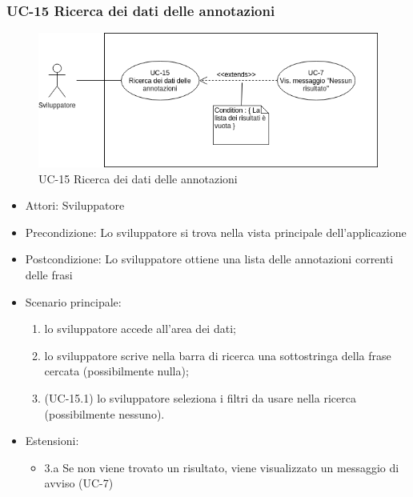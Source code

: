 \subsubsection{UC-15 Ricerca dei dati delle annotazioni}
		\begin{figure}[h]
			\centering
			\includegraphics[scale=0.7]{images/UC-15.png}
			\caption{UC-15 Ricerca dei dati delle annotazioni}
		\end{figure}			
	
		\begin{itemize}
			\item Attori: Sviluppatore
			\item Precondizione: Lo sviluppatore si trova nella vista principale dell'applicazione
			\item Postcondizione: Lo sviluppatore ottiene una lista delle annotazioni correnti delle frasi
			\item Scenario principale:
				\begin{enumerate}
					\item lo sviluppatore accede all'area dei dati;
					\item lo sviluppatore scrive nella barra di ricerca una sottostringa della frase cercata (possibilmente nulla);
					\item (UC-15.1) lo sviluppatore seleziona i filtri da usare nella ricerca (possibilmente nessuno).
				\end{enumerate}
			\item Estensioni:
				\begin{itemize}
					\item 3.a Se non viene trovato un risultato, viene visualizzato un messaggio di avviso (UC-7)
				\end{itemize}
		\end{itemize}


	
